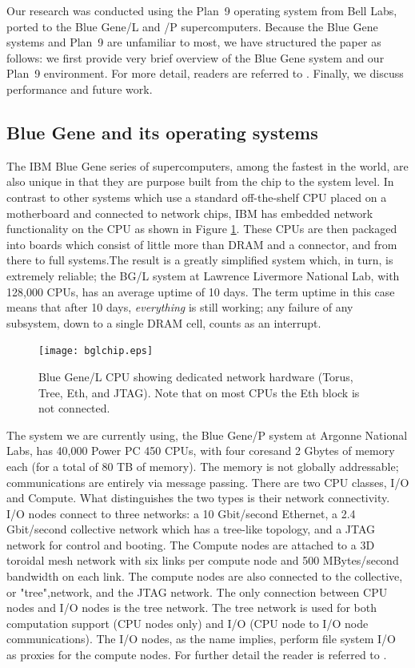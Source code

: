 \documentclass[letterpaper,twocolumn,10pt]{article}
\begin{document}
Our research was conducted using the Plan~9 operating system from Bell Labs, ported to the Blue Gene/L and /P supercomputers. Because the Blue Gene systems and Plan~9 are unfamiliar to most, we have structured the paper as follows: we first provide very brief overview of the Blue Gene system and our Plan~9 environment. For more detail, readers are referred to \cite{plan9bgp}. 
Finally, we discuss performance and future work. 

\subsection{Blue Gene and its operating systems}
The IBM Blue Gene\cite{DBLP:journals/ibmrd/GaraBCCCGHHHKLOSTV05} series of supercomputers, among the fastest in the world, are also unique in that they are purpose built from the chip to the system level. In contrast to other systems which use a standard off-the-shelf CPU placed on a motherboard and connected to network chips, IBM has embedded network functionality on the CPU as shown in Figure \ref{bglchip}. These CPUs are then packaged into boards which consist of little more than DRAM and a connector, and from there to full systems.The result is a greatly simplified system which, in turn, is extremely reliable; the BG/L system at Lawrence Livermore National Lab, with 128,000 CPUs, has an average uptime of 10 days. The term uptime in this case means that after 10 days, {\em everything} is still working; any failure of any subsystem, down to a single DRAM cell, counts as an interrupt.
\begin{figure}
\texttt{[image: bglchip.eps]} 
\caption{\label{bglchip}Blue Gene/L CPU showing dedicated network hardware (Torus, Tree, Eth, and JTAG). Note that on most CPUs the Eth block is not connected.}
\end{figure}

The system we are currently using, the Blue Gene/P system at Argonne National Labs, has 40,000 Power PC 450 CPUs, 
with four coresand 2 Gbytes of memory each (for a total of 80 TB of memory). The memory is not globally addressable; communications are entirely via message passing. 
There are two CPU classes, I/O and Compute. What distinguishes the two types is their network connectivity. I/O nodes connect
to three networks: a 10 Gbit/second Ethernet, a 2.4 Gbit/second collective network which has a tree-like topology, and
a JTAG network for control and booting. The Compute nodes are attached to a 3D toroidal mesh network with six links per compute node and 500 MBytes/second bandwidth on each link.  The compute nodes are also connected to the collective, or "tree",network, and the JTAG network. The only connection between CPU nodes and I/O nodes is the tree network. The tree network is used for both computation support (CPU nodes only) and I/O (CPU node to I/O node communications). The I/O nodes, as the name implies, perform file system I/O as proxies for the 
compute nodes. For further detail the reader is referred to \cite{plan9bgp}. 
\end{document}
